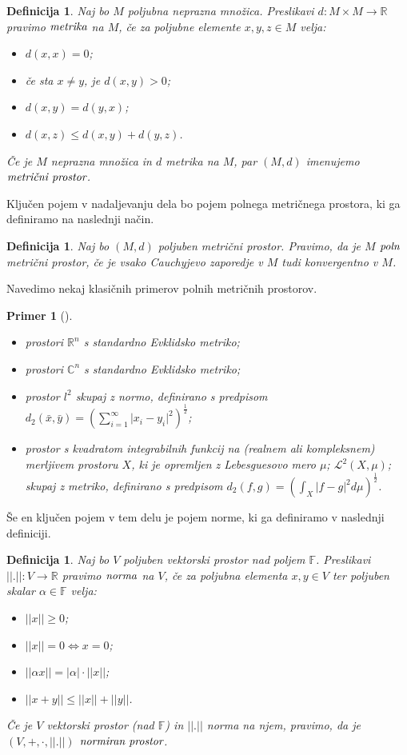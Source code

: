 \documentclass[12pt,a4paper,oneside,fleqn,openany]{book}
\newtheorem{definicija}[izrek]{Definicija}
\newtheorem{primer*}[izrek]{Primer}
\newenvironment{primer}[1][]{\begin{primer*}[#1]\renewcommand*{\qedsymbol}{$\diamondsuit$}\pushQED{\qed}}{\popQED\end{primer*}}
\newcommand{\R}{\mathbb{R}}
\newcommand{\F}{\mathbb{F}}
\newcommand{\C}{\mathbb{C}}
\newcommand{\abs}[1]{\ensuremath{\lvert #1 \rvert}}
\newcommand{\norm}[1]{\abs{\abs{#1}}}
\newcommand{\pojem}[1]{\ensuremath{\emph{#1}}}
\newcommand{\map}[3]{\ensuremath{{#1}:{#2}\rightarrow{#3}}}
\begin{document}
\begin{definicija}
	\label{def:metrika}
	Naj bo $M$ poljubna neprazna množica. Preslikavi $\map{d}{M\times M}{\R}$ pravimo \pojem{metrika} na $M$, če za poljubne elemente $x, y, z\in M$ velja: \begin{itemize}
		\item $d(x, x) = 0$;
		\item če sta $x\neq y$, je $d(x, y) > 0$;
		\item $d(x, y) = d(y, x)$;
		\item $d(x, z) \leq d(x, y) + d(y, z)$.
	\end{itemize}
	Če je $M$ neprazna množica in $d$ metrika na $M$, par $(M, d)$ imenujemo \pojem{metrični prostor}.
\end{definicija}
Ključen pojem v nadaljevanju dela bo pojem polnega metričnega prostora, ki ga definiramo na naslednji način. 
\begin{definicija}
	\label{def:PolnMP}
	Naj bo $(M, d)$ poljuben metrični prostor. Pravimo, da je $M$ \pojem{poln} metrični prostor, če je vsako Cauchyjevo zaporedje v $M$ tudi konvergentno v $M$.
\end{definicija}
Navedimo nekaj klasičnih primerov polnih metričnih prostorov.
\begin{primer}
	\label{prim:PolnMP}
	~
	
	\begin{itemize}
		\item prostori $\R^n$ s standardno Evklidsko metriko;
		\item prostori $\C^n$ s standardno Evklidsko metriko;
		\item prostor $l^2$ skupaj z normo, definirano s predpisom $d_2(\bar{x}, \bar{y})= \left(\displaystyle\sum_{i=1}^{\infty}\abs{x_i - y_i}^2\right)^\frac{1}{2}$;
		\item prostor s kvadratom integrabilnih funkcij na (realnem ali kompleksnem) merljivem prostoru $X$, ki je opremljen z Lebesguesovo mero $\mu$; $\mathcal{L}^2(X, \mu)$; skupaj z metriko, definirano s predpisom $d_2(f, g)= \left(\displaystyle\int_{X}\abs{f-g}^2d\mu\right)^\frac{1}{2}$.
	\end{itemize}
\end{primer}
Še en ključen pojem v tem delu je pojem norme, ki ga definiramo v naslednji definiciji.
\begin{definicija}
	\label{def:norm}
	Naj bo $V$ poljuben vektorski prostor nad poljem $\F$. Preslikavi $\map{\norm{.}}{V}{\R}$ pravimo \pojem{norma} na $V$, če za poljubna elementa $x, y\in V$ ter poljuben skalar $\alpha\in \F$ velja: \begin{itemize}
		\item $\norm{x} \geq 0$;
		\item $\norm{x} = 0 \iff x = 0$;
		\item $\norm{\alpha x} = \abs{\alpha}\cdot\norm{x}$;
		\item $\norm{x + y} \leq \norm{x} + \norm{y}$.
	\end{itemize}
	Če je $V$ vektorski prostor (nad $\F$) in $\norm{.}$ norma na njem, pravimo, da je $(V, +, \cdot, \norm{.})$ \pojem{normiran prostor}.
\end{definicija}
\end{document}

